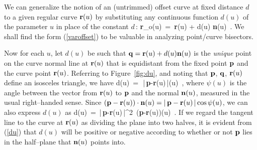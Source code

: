 We can generalize the notion of an (untrimmed) offset curve at fixed
distance $d$ to a given regular curve ${\bf r}(u)$ by substituting
any continuous function $d(u)$ of the parameter $u$ in place of the
constant $d\,$:
\be \label{varoffset}
{\bf r}_o(u) \,=\, {\bf r}(u) + d(u) {\bf n}(u) \,.
\ee
We shall find the form (\ref{varoffset}) to be valuable in analyzing
point/curve bisectors.


Now for each $u$, let $d(u)$ be such that ${\bf q}={\bf r}(u)+d(u)
{\bf n}(u)$ is the {\it unique\/} point on the curve normal line at
${\bf r}(u)$ that is equidistant from the fixed point ${\bf p}$ and
the curve point ${\bf r}(u)$. Referring to Figure~\ref{fig:du}, and
noting that ${\bf p}$, ${\bf q}$, ${\bf r}(u)$ define an isosceles
triangle, we have
\be \label{du0}
d(u) \,=\, \half\,|\,{\bf p}-{\bf r}(u)\,|\sec\psi(u) \,,
\ee
where $\psi(u)$ is the angle between the vector from ${\bf r}(u)$
to ${\bf p}$ and the normal ${\bf n}(u)$, measured in the usual
right--handed sense.
Since $({\bf p}-{\bf r}(u))\cdot{\bf n}(u)=|\,{\bf p}-{\bf r}(u)\,|
\cos\psi(u)$, we can also express $d(u)$ as
\be \label{du}
d(u) \,=\, {|\,{\bf p}-{\bf r}(u)\,|^2 \,({\bf p}-{\bf r}(u))(u)} \,.
\ee
If we regard the tangent line to the curve at ${\bf r}(u)$ as dividing
the plane into two halves, it is evident from (\ref{du}) that $d(u)$
will be positive or negative according to whether or not ${\bf p}$
lies in the half--plane that ${\bf n}(u)$ points into.



